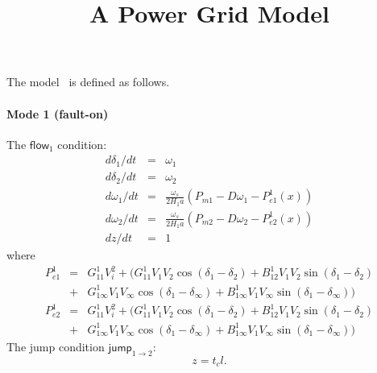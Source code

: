 \documentclass{article}
\title{A Power Grid Model}
\author{}
\newcommand{\flow}{\mathsf{flow}}
\newcommand{\jump}{\mathsf{jump}}
\begin{document}
\maketitle

The model~\cite{source} is defined as follows. 

\paragraph{Mode 1 (fault-on)}
The $\flow_1$ condition:
\begin{eqnarray*}
d\delta_1/dt &=& \omega_1\\
d\delta_2/dt &=& \omega_2\\
d\omega_1/dt &=& \frac{\omega_s}{2H_1a}(P_{m1} - D\omega_1 - P_{e1}^1(x))\\
d\omega_2/dt &=& \frac{\omega_s}{2H_1a}(P_{m2} - D\omega_2 - P_{e2}^1(x))\\
dz/dt &=& 1
\end{eqnarray*}
where
\begin{eqnarray*}
P_{e1}^1 &=& G_{11}^1V_i^2 + \Big(G_{11}^1 V_1V_2\cos(\delta_1-\delta_2) +
B_{12}^1 V_1V_2\sin(\delta_1-\delta_2)\\
&+& G_{1\infty}^1
V_1V_{\infty}\cos(\delta_1-\delta_{\infty}) + B_{1\infty}^1
V_1V_{\infty}\sin(\delta_1-\delta_{\infty}) \Big)\\
P_{e2}^1 &=& G_{11}^1V_i^2 + \Big(G_{11}^1 V_1V_2\cos(\delta_1-\delta_2) +
B_{12}^1 V_1V_2\sin(\delta_1-\delta_2)\\
&+& G_{1\infty}^1
V_1V_{\infty}\cos(\delta_1-\delta_{\infty}) + B_{1\infty}^1
V_1V_{\infty}\sin(\delta_1-\delta_{\infty}) \Big)
\end{eqnarray*}
The jump condition $\jump_{1 \rightarrow 2}:$
$$z = t_cl.$$
\end{document}
